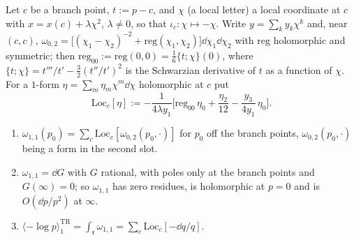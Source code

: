 Let $c$ be a branch point, $t:=p-c$, and $\chi$ (a local letter) a local coordinate at $c$ with $x=x(c)+\lambda\chi^2$, $\lambda\neq 0$, so that $\iota_c\colon\chi\mapsto-\chi$. Write $y=\sum_ky_k\chi^k$ and, near $(c,c)$, $\omega_{0,2}=\big[(\chi_1-\chi_2)^{-2}+\mathrm{reg}(\chi_1,\chi_2)\big]\dd\chi_1\dd\chi_2$ with $\mathrm{reg}$ holomorphic and symmetric; then $\mathrm{reg}_{00}:=\mathrm{reg}(0,0)=\frac16\{t;\chi\}(0)$, where $\{t;\chi\}=t'''/t'-\frac32(t''/t')^2$ is the Schwarzian derivative of $t$ as a function of $\chi$. For a $1$-form $\eta=\sum_m\eta_m\chi^m\dd\chi$ holomorphic at $c$ put
\begin{equation}
\label{eq:mod-loc}
\mathrm{Loc}_c[\eta]:=-\frac{1}{4\lambda y_1}\Big[\mathrm{reg}_{00}\,\eta_0+\frac{\eta_2}{12}-\frac{y_3}{4y_1}\,\eta_0\Big].
\end{equation}

\begin{lem}
\label{lem:mod-w11}
\begin{enumerate}
\item $\omega_{1,1}(p_0)=\sum_c\mathrm{Loc}_c[\omega_{0,2}(p_0,\cdot)]$ for $p_0$ off the branch points, $\omega_{0,2}(p_0,\cdot)$ being a form in the second slot.
\item $\omega_{1,1}=\dd G$ with $G$ rational, with poles only at the branch points and $G(\infty)=0$; so $\omega_{1,1}$ has zero residues, is holomorphic at $p=0$ and is $O(\dd p/p^2)$ at $\infty$.
\item $\langle-\log p\rangle^{\mathrm{TR}}_1=\int_{\mathfrak r}\omega_{1,1}=\sum_c\mathrm{Loc}_c[-\dd q/q]$.
\end{enumerate}
\end{lem}

